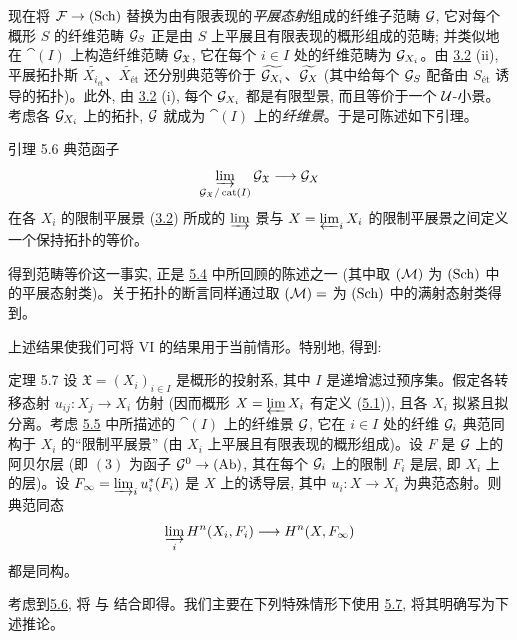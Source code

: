 现在将 $\Ff \to (\Sch)$ 替换为由有限表现的\emph{平展态射}组成的纤维子范畴 ${\mathcal G}$, 它对每个概形 $S$ 的纤维范畴 ${\mathcal G}_{S}$ 正是由 $S$ 上平展且有限表现的概形组成的范畴; 并类似地在 $\cat(I)$ 上构造纤维范畴 ${\mathcal G}_{\mathfrak{X}}$, 它在每个 $i \in I$ 处的纤维范畴为 ${\mathcal G}_{X_i}$。由 \hyperref[VII.cor3.2]{3.2} (ii), 平展拓扑斯 $\widetilde{X_{i_{\text{ét}}}}$、$\widetilde{X_{\text{ét}}}$ 还分别典范等价于 $\widetilde{{\mathcal G}_{X_{i}}}$、$\widetilde{{\mathcal G}_{X}}$ (其中给每个 ${\mathcal G}_S$ 配备由 $S_{\text{ét}}$ 诱导的拓扑)。此外, 由 \hyperref[VII.cor3.2]{3.2} (i), 每个 ${\mathcal G}_{X_i}$ 都是有限型景, 而且等价于一个 ${\mathcal U}$-小景。考虑各 ${\mathcal G}_{X_i}$ 上的拓扑, ${\mathcal G}$ 就成为 $\cat(I)$ 上的\emph{纤维景}。于是可陈述如下引理。

\begin{enonce*}{引理 5.6}
典范函子
$$
\varinjlim_{\Gg_{\mathfrak{X}}/\cat(I)}
\Gg_{\mathfrak{X}} \to \Gg_X
$$
在各 $X_i$ 的限制平展景 (\hyperref[VII.cor3.2]{3.2}) 所成的 $\varinjlim$ 景与 $X = \varprojlim_i X_i$ 的限制平展景之间定义\pageoriginale 一个保持拓扑的等价。
\end{enonce*}

得到范畴等价这一事实, 正是 \hyperref[VII.subsec5.4]{5.4} 中所回顾的陈述之一 (其中取 $({\mathcal M})$ 为 $(\operatorname{Sch})$ 中的平展态射类)。关于拓扑的断言同样通过取 $({\mathcal M})=$ 为 $(\operatorname{Sch})$ 中的满射态射类得到。

上述结果使我们可将 VI 的结果用于当前情形。特别地, 得到:

\begin{enonce*}{定理 5.7}
设 $\mathfrak{X} = (X_i)_{i \in I}$ 是概形的投射系, 其中 $I$ 是递增滤过预序集。假定各转移态射 $u_{ij} : X_j \to X_i$ 仿射 (因而概形 $X = \varprojlim X_i$ 有定义 (\hyperref[VII.subsec5.1]{5.1})), 且各 $X_i$ 拟紧且拟分离。考虑 \hyperref[VII.subsec5.5]{5.5} 中所描述的 $\cat(I)$ 上的纤维景 ${\mathcal G}$, 它在 $i \in I$ 处的纤维 ${\mathcal G}_i$ 典范同构于 $X_i$ 的“限制平展景” (由 $X_i$ 上平展且有限表现的概形组成)。设 $F$ 是 ${\mathcal G}$ 上的阿贝尔层 (即 $(3)$ 为函子 $\Gg^{0} \to (\Ab)$, 其在每个 ${\mathcal G}_i$ 上的限制 $F_i$ 是层, 即 $X_i$ 上的层)。设 $F_{\infty} =
\varinjlim_{i} u^{\ast}_i (F_i)$ 是 $X$ 上的诱导层, 其中 $u_i : X \to X_i$ 为典范态射。则典范同态
$$
\varinjlim_i H^n (X_i, F_i) \to H^n (X, F_{\infty})
$$
都是同构。
\end{enonce*}

考虑到\pageoriginale \hyperref[VII.lem5.6]{5.6}, 将  与  结合即得。我们主要在下列特殊情形下使用 \hyperref[VII.thm5.7]{5.7}, 将其明确写为下述推论。

